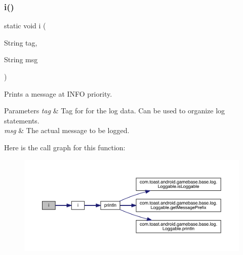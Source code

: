 \subsubsection{\texorpdfstring{i()}{i()}\hspace{0.1cm}{\footnotesize\ttfamily [2/2]}}
{\footnotesize\ttfamily static void i (\begin{DoxyParamCaption}\item[{String}]{tag,  }\item[{String}]{msg }\end{DoxyParamCaption})\hspace{0.3cm}{\ttfamily [static]}}



Prints a message at I\+N\+FO priority. 


\begin{DoxyParams}{Parameters}
{\em tag} & Tag for for the log data. Can be used to organize log statements. \\
\hline
{\em msg} & The actual message to be logged. \\
\hline
\end{DoxyParams}
Here is the call graph for this function\+:
\nopagebreak
\begin{figure}[H]
\begin{center}
\leavevmode
\includegraphics[width=350pt]{classcom_1_1toast_1_1android_1_1gamebase_1_1base_1_1log_1_1_logger_a7cd0a94de5c27beee2da674bfcccfece_cgraph}
\end{center}
\end{figure}
\mbox{\label{classcom_1_1toast_1_1android_1_1gamebase_1_1base_1_1log_1_1_logger_a5b9aa7ce47bb48e51f971d5a6a2846e1}} 

